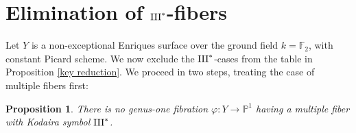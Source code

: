 \documentclass[oneside, 12pt]{amsart}
\newcommand\mylabel[1]{\label{#1}\marginpar{\vspace{-1ex}\medskip\medskip\footnotesize \tt #1}}
\renewcommand\mylabel[1]{\label{#1}}
\newtheorem{proposition}[theorem]{Proposition}
\theoremstyle{definition}
\theoremstyle{remark}
\newcommand{\FF}{\mathbb{F}}
\newcommand{\PP}{\mathbb{P}}
\newcommand{\III}{\text{\rm III}}
\newcommand{\ra}{\rightarrow}
\begin{document}
\section{Elimination of    \texorpdfstring{$\III^*$}{III*}-fibers}
\mylabel{Elimination III*}

Let $Y$ is a non-exceptional Enriques surface over the ground field $k=\FF_2$, with constant Picard scheme.
We now exclude the $\III^*$-cases from the table in Proposition \ref{key reduction}.
We proceed in two steps, treating the case of multiple fibers first:

\begin{proposition}
\mylabel{no multiple III*}
There is no genus-one fibration  $\varphi:Y\ra\PP^1$ having a multiple  fiber with Kodaira symbol $\III^*$. 
\end{proposition}
\end{document}
